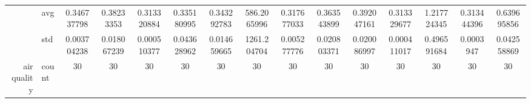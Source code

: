\begin{table}[H]
{\begin{tabular}{rlccc|c|c|c|c|c|ccccc}
			                                                                               & avg                & \cellcolor[rgb]{ 1,  .922,  .518}0.346737798                                   & \cellcolor[rgb]{ 1,  .922,  .518}0.38233353                                    & \cellcolor[rgb]{ .388,  .745,  .482}\textcolor[rgb]{ 0,  .38,  0}{0.313320884} & \cellcolor[rgb]{ .788,  .859,  .502}0.335180995 & \cellcolor[rgb]{ .933,  .902,  .514}0.343292783                                & \cellcolor[rgb]{ .973,  .412,  .42}586.2065996  & \cellcolor[rgb]{ .467,  .765,  .486}0.317677033                                & \cellcolor[rgb]{ 1,  .922,  .518}0.363543899    & \cellcolor[rgb]{ 1,  .922,  .518}0.392047161    & \cellcolor[rgb]{ .388,  .745,  .482}0.313329677 & \cellcolor[rgb]{ 1,  .922,  .518}1.217724345    & \cellcolor[rgb]{ .388,  .745,  .482}0.313444396 & \cellcolor[rgb]{ 1,  .922,  .518}0.639695856    \\
			                                                                               & std                & 0.003704238                                                                    & 0.018067239                                                                    & 0.000510377                                                                    & 0.043628962                                     & 0.014659665                                                                    & 1261.204704                                     & 0.005277776                                                                    & 0.020803371                                     & 0.020086997                                     & 0.000411017                                     & 0.496591684                                     & 0.0003947                                       & 0.042558869                                     \\
			air quality                                                                    & count              & 30                                                                             & 30                                                                             & 30                                                                             & 30                                              & 30                                                                             & 30                                              & 30                                                                             & 30                                              & 30                                              & 30                                              & 30                                              & 30                                              & 30                                              \\

\end{tabular}}
\end{table}
